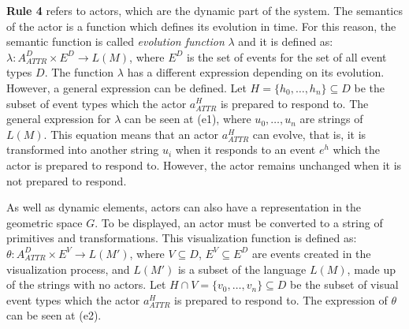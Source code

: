 \documentclass{svmult}
\begin{document}

\textbf{Rule 4} refers to actors, which are the dynamic part of the system. The semantics
of the actor is a function which defines its evolution in time. For this reason, the semantic
function is called \textit{evolution function} $\lambda$ and it is defined as:
$\lambda: A_{ATTR}^D \times E^D \rightarrow L(M)$, 
where $E^D$ is the set of events for the set of all event types $D$. The function $\lambda$ has a different expression depending on its evolution. However, a
general expression can be defined. Let $H = \{ h_0, \ldots,h_n \} \subseteq D$ be the subset of
event types which the actor $a_{ATTR}^H$ is prepared to respond to. 
The general expression for $\lambda$ can be seen at (e1), 
where $u_0, \ldots, u_n$ are strings of $L(M)$. This equation means that an actor $a_{ATTR}^{H}$ can
evolve, that is, it is transformed into another string $u_i$ when it responds to an event $e^h$
which the actor is prepared to respond to. However, the actor remains unchanged when it is not
prepared to respond.

As well as dynamic elements, actors can also have a representation in the geometric space $G$. To be displayed, an actor must be converted to a string of primitives and transformations. 
This visualization function is defined as:
$\theta: A_{ATTR}^D \times E^V \rightarrow L(M')$, 
where $V \subseteq D$, $E^V \subseteq E^D$ are events created in the visualization process, and
$L(M')$ is a subset of the language $L(M)$, made up of the strings with no actors. Let $H \cap V =
\{ v_0, \ldots,v_n \} \subseteq D$ be the subset of visual event types which the actor $a_{ATTR}^H$ is
prepared to respond to. 
The expression of $\theta$ can be seen at (e2).


\end{document}
